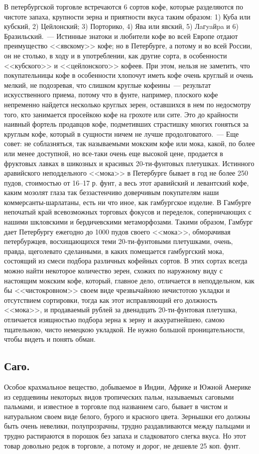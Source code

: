В петербургской торговле встречаются 6 сортов кофе, которые разделяются по чистоте запаха, крупности зерна и приятности вкуса таким образом: 1) Куба или кубский, 2) Цейлонский; 3) Порторико, 4) Ява или явский, 5) Лaгyaйpa и 6) Бразильский.~--- Истинные знатоки и любители кофе во всей Европе отдают преимущество <<явскому>> кофе; но в Петербурге, а потому и во всей России, он не столько, в ходу и в употреблении, как другие сорта, в особенности <<кубского>> и <<цейлонского>> кофеев. При этом, нельзя не заметить, что покупательницы кофе в особенности хлопочут иметь кофе очень круглый и очень мелкий, не подозревая, что слишком круглые кофеины~--- результат искусственного приема, потому что в фунте, например, плоского кофе непременно найдется несколько круглых зерен, оставшихся в нем по недосмотру того, кто занимается просейкою кофе на грохоте или сите. Это до крайности наивный фортель продавцов кофе, подметивших страстишку многих гоняться за круглым кофе, который в сущности ничем не лучше продолговатого.~--- Еще совет: не соблазняться, так называемыми мокским кофе или мока, какой, по более или менее доступной, но все-таки очень еще высокой цене, продается в фруктовых лавках в шикозных и красивых 20-ти-фунтовых плетушках. Истинного аравийского неподдельного <<мока>> в Петербурге бывает в год не более 250 пудов, стоимостью от 16–17 р. фунт, а весь этот аравийский и левантский кофе, каким мозолят глаза так беззастенчиво доверчивым покупателям наши коммерсанты-шарлатаны, есть ни что иное, как гамбургское изделие. В Гамбурге непочатый край всевозможных торговых фокусов и переделок, соперничающих с нашими шкловскими и бердичевскими метаморфозами. Такими образом, Гамбург дает Петербургу ежегодно до 1000 пудов своего <<мока>>, обморачивая петербуржцев, восхищающихся теми 20-ти-фунтовыми плетушками, очень, правда, щеголевато сделанными, в каких помещается гамбургский мока, состоящий из смеси подбора различных кофейных сортов. В этих сортах всегда можно найти некоторое количество зерен, схожих по наружному виду с настоящим мокским кофе, который, главное дело, отличается в неподдельном, как бы <<чистокровном>> своем виде чрезвычайною нечистотою укладки и отсутствием сортировки, тогда как этот исправляющий его должность <<мока>>, и продаваемый рублей за двенадцать 20-ти-фунтовая плетушка, отличается изящностью подбора зерна к зерну и аккуратнейшею, самою тщательною, чисто немецкою укладкой. Не нужно большой проницательности, чтобы видеть и понять обман.

\subsection{Саго.}
Особое крахмальное вещество, добываемое в Индии, Африке и Южной Америке из сердцевины некоторых видов тропических пальм, называемых саговыми пальмами, и известное в торговле под названием саго, бывает в чистом и натуральном своем виде белого, бурого и красного цвета. Зернышки его должны быть очень невелики, полупрозрачны, трудно раздавливаются между пальцами и трудно растираются в порошок без запаха и сладковатого слегка вкуса. Но этот товар довольно редок в торговле, а потому и дорог, не дешевле 25 коп. фунт.

